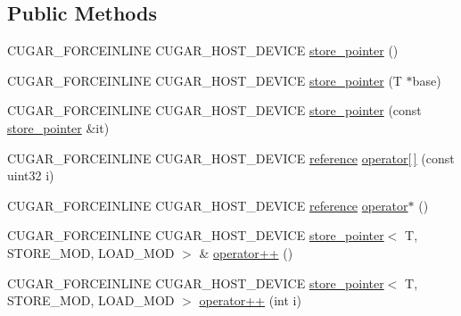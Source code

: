 \subsection*{Public Methods}
\begin{DoxyCompactItemize}
\item 
C\+U\+G\+A\+R\+\_\+\+F\+O\+R\+C\+E\+I\+N\+L\+I\+NE C\+U\+G\+A\+R\+\_\+\+H\+O\+S\+T\+\_\+\+D\+E\+V\+I\+CE \hyperlink{structcugar_1_1cuda_1_1store__pointer_a530252e1258eb3b809130eaa3ce79595}{store\+\_\+pointer} ()
\item 
C\+U\+G\+A\+R\+\_\+\+F\+O\+R\+C\+E\+I\+N\+L\+I\+NE C\+U\+G\+A\+R\+\_\+\+H\+O\+S\+T\+\_\+\+D\+E\+V\+I\+CE \hyperlink{structcugar_1_1cuda_1_1store__pointer_a09cd34b73ac6e986408d358b12c765b4}{store\+\_\+pointer} (T $\ast$base)
\item 
C\+U\+G\+A\+R\+\_\+\+F\+O\+R\+C\+E\+I\+N\+L\+I\+NE C\+U\+G\+A\+R\+\_\+\+H\+O\+S\+T\+\_\+\+D\+E\+V\+I\+CE \hyperlink{structcugar_1_1cuda_1_1store__pointer_a694b07fce5543397ab2424e031f8e597}{store\+\_\+pointer} (const \hyperlink{structcugar_1_1cuda_1_1store__pointer}{store\+\_\+pointer} \&it)
\item 
C\+U\+G\+A\+R\+\_\+\+F\+O\+R\+C\+E\+I\+N\+L\+I\+NE C\+U\+G\+A\+R\+\_\+\+H\+O\+S\+T\+\_\+\+D\+E\+V\+I\+CE \hyperlink{structcugar_1_1cuda_1_1store__reference}{reference} \hyperlink{structcugar_1_1cuda_1_1store__pointer_a80f691a8ca17e20909b710581e29eac2}{operator\mbox{[}$\,$\mbox{]}} (const uint32 i)
\item 
C\+U\+G\+A\+R\+\_\+\+F\+O\+R\+C\+E\+I\+N\+L\+I\+NE C\+U\+G\+A\+R\+\_\+\+H\+O\+S\+T\+\_\+\+D\+E\+V\+I\+CE \hyperlink{structcugar_1_1cuda_1_1store__reference}{reference} \hyperlink{structcugar_1_1cuda_1_1store__pointer_ac3707b27702fa0ef02349be879a4cc0e}{operator$\ast$} ()
\item 
C\+U\+G\+A\+R\+\_\+\+F\+O\+R\+C\+E\+I\+N\+L\+I\+NE C\+U\+G\+A\+R\+\_\+\+H\+O\+S\+T\+\_\+\+D\+E\+V\+I\+CE \hyperlink{structcugar_1_1cuda_1_1store__pointer}{store\+\_\+pointer}$<$ T, S\+T\+O\+R\+E\+\_\+\+M\+OD, L\+O\+A\+D\+\_\+\+M\+OD $>$ \& \hyperlink{structcugar_1_1cuda_1_1store__pointer_ae42f6b879227fc099989d6c709230de5}{operator++} ()
\item 
C\+U\+G\+A\+R\+\_\+\+F\+O\+R\+C\+E\+I\+N\+L\+I\+NE C\+U\+G\+A\+R\+\_\+\+H\+O\+S\+T\+\_\+\+D\+E\+V\+I\+CE \hyperlink{structcugar_1_1cuda_1_1store__pointer}{store\+\_\+pointer}$<$ T, S\+T\+O\+R\+E\+\_\+\+M\+OD, L\+O\+A\+D\+\_\+\+M\+OD $>$ \hyperlink{structcugar_1_1cuda_1_1store__pointer_a09257ce514e6fa8625fdfe620c1911bf}{operator++} (int i)
\item 

\end{DoxyCompactItemize}

